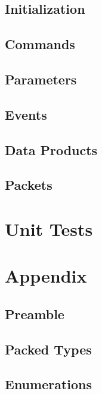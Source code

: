 \subsection{Initialization}


\subsection{Commands}



\subsection{Parameters}



\subsection{Events}



\subsection{Data Products}



\subsection{Packets}



\section{Unit Tests}



\section{Appendix}

\subsection{Preamble}



\subsection{Packed Types}



\subsection{Enumerations}




